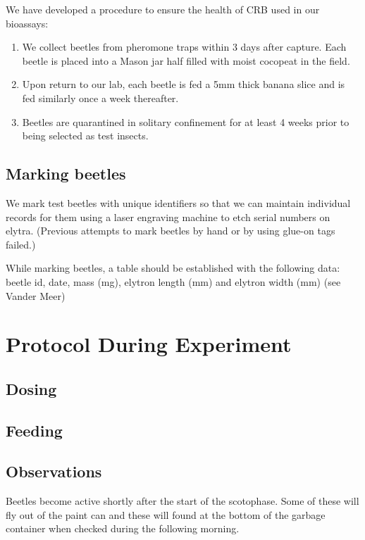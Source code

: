 \documentclass[twocolumn, 12pt,letterpaper,english,bibliography=totocnumbered, abstract=on]{scrartcl}
\begin{document}
We have developed a procedure to ensure the health of CRB used in our bioassays:
\begin{enumerate}
	\item We collect beetles from pheromone traps within 3 days after capture. Each beetle is placed into a Mason jar half filled with moist cocopeat in the field.  
	\item Upon return to our lab, each beetle is fed a 5mm thick banana slice and is fed similarly once a week thereafter.
	\item Beetles are quarantined in solitary confinement for at least 4 weeks prior to being selected as test insects.
\end{enumerate}

\subsection{Marking beetles}

We mark test beetles with unique identifiers so that we can maintain individual records for them using a laser engraving machine to etch serial numbers on elytra. (Previous attempts to mark beetles by hand or by using glue-on tags failed.)

While marking beetles, a table should be established with the following data: beetle id, date, mass (mg), elytron length (mm) and elytron width (mm) (see Vander Meer)  

\section{Protocol During Experiment} 

\subsection{Dosing}

\subsection{Feeding}

\subsection{Observations}

Beetles become active shortly after the start of the scotophase. Some of these will fly out of the paint can and these will found at the bottom of the garbage container when checked during the following morning.
\end{document}
